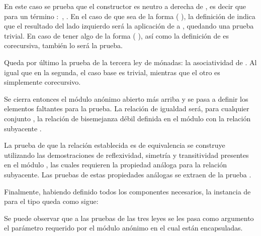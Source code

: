 
En este caso se prueba que el constructor  es neutro a derecha de , es decir que para un término  $:$  \AgdaDatatype{$\bot$},    \AgdaFunction{$\approx$} . En el caso de que  sea de la forma ( ), la definición de  indica que el resultado del lado izquierdo será la aplicación de  a , quedando una prueba trivial. En caso de tener algo de la forma ( ), así como la definición de  es corecursiva, también lo será la prueba. 

Queda por último la prueba de la tercera ley de mónadas: la asociatividad de . Al igual que en la segunda, el caso base es trivial, mientras que el otro es simplemente corecursivo. 


Se cierra entonces el módulo anónimo abierto más arriba y se pasa a definir los elementos faltantes para la prueba. La relación de igualdad será, para cualquier conjunto , la relación de bisemejanza débil \AgdaFunction{$\_\approx\_$} definida en el módulo  con la relación subyacente \AgdaBound{$\_\sim\_$}.


La prueba de que la relación establecida es de equivalencia se construye utilizando las demostraciones de reflexividad, simetría y transitividad presentes en el módulo , las cuales requieren la propiedad análoga para la relación subyacente. Las pruebas de estas propiedades análogas se extraen de la prueba . 


Finalmente, habiendo definido todos los componentes necesarios, la instancia de  para el tipo \AgdaDatatype{$\_\bot$} queda como sigue:


Se puede observar que a las pruebas de las tres leyes se les pasa como argumento el parámetro requerido por el módulo anónimo en el cual están encapsuladas. 

